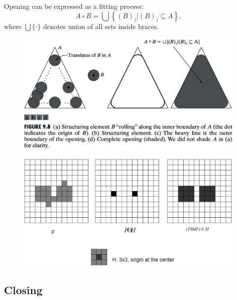 \begin{frame}
Opening can be expressed as a fitting process:
\[
A \circ B = \bigcup \left \{ \left ( B \right )_{z} | \left ( B \right )_{z} \subseteq A \right \}.
\]
where $\bigcup\{\cdot\}$ denotes union of all sets inside braces.
\begin{figure}
\centering
\includegraphics[width=.7\textwidth]{fig-9-8.png}
\end{figure}
\end{frame}

\begin{frame}
\begin{figure}[!h]
\includegraphics[width=\textwidth]{opening-ex-1.png}
\end{figure}
\end{frame}

\subsection{Closing}

